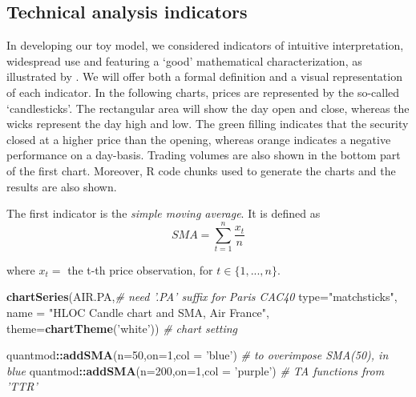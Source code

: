 \documentclass[
  11pt,
]{article}
\newenvironment{Shaded}{\begin{snugshade}}{\end{snugshade}}
\newcommand{\CommentTok}[1]{\textcolor[rgb]{0.56,0.35,0.01}{\textit{#1}}}
\newcommand{\DataTypeTok}[1]{\textcolor[rgb]{0.13,0.29,0.53}{#1}}
\newcommand{\DecValTok}[1]{\textcolor[rgb]{0.00,0.00,0.81}{#1}}
\newcommand{\KeywordTok}[1]{\textcolor[rgb]{0.13,0.29,0.53}{\textbf{#1}}}
\newcommand{\NormalTok}[1]{#1}
\newcommand{\OperatorTok}[1]{\textcolor[rgb]{0.81,0.36,0.00}{\textbf{#1}}}
\newcommand{\StringTok}[1]{\textcolor[rgb]{0.31,0.60,0.02}{#1}}
\begin{document}
\hypertarget{technical-analysis-indicators}{%
\subsection{Technical analysis
indicators}\label{technical-analysis-indicators}}

In developing our toy model, we considered indicators of intuitive
interpretation, widespread use and featuring a `good' mathematical
characterization, as illustrated by \citet{Neftci1991}. We will offer
both a formal definition and a visual representation of each indicator.
In the following charts, prices are represented by the so-called
`candlesticks'. The rectangular area will show the day open and close,
whereas the wicks represent the day high and low. The green filling
indicates that the security closed at a higher price than the opening,
whereas orange indicates a negative performance on a day-basis. Trading
volumes are also shown in the bottom part of the first chart. Moreover,
R code chunks used to generate the charts and the results are also
shown.

The first indicator is the \emph{simple moving average}. It is defined
as \begin{equation} 
SMA = \displaystyle \sum_{t=1}^{n} \frac{x_t}{n} 
\end{equation}

where \(x_t =\) the t-th price observation, for \(t \in \{1,...,n\}\).

\begin{Shaded}
\begin{Highlighting}[]
\KeywordTok{chartSeries}\NormalTok{(AIR.PA,}\CommentTok{# need '.PA' suffix for Paris CAC40}
            \DataTypeTok{type=}\StringTok{"matchsticks"}\NormalTok{,}
            \DataTypeTok{name =} \StringTok{"HLOC Candle chart and SMA, Air France"}\NormalTok{,}
            \DataTypeTok{theme=}\KeywordTok{chartTheme}\NormalTok{(}\StringTok{'white'}\NormalTok{)) }\CommentTok{# chart setting}

\NormalTok{quantmod}\OperatorTok{::}\KeywordTok{addSMA}\NormalTok{(}\DataTypeTok{n=}\DecValTok{50}\NormalTok{,}\DataTypeTok{on=}\DecValTok{1}\NormalTok{,}\DataTypeTok{col =} \StringTok{'blue'}\NormalTok{) }\CommentTok{# to overimpose SMA(50), in blue}
\NormalTok{quantmod}\OperatorTok{::}\KeywordTok{addSMA}\NormalTok{(}\DataTypeTok{n=}\DecValTok{200}\NormalTok{,}\DataTypeTok{on=}\DecValTok{1}\NormalTok{,}\DataTypeTok{col =} \StringTok{'purple'}\NormalTok{) }\CommentTok{# TA functions from 'TTR' }
\end{Highlighting}
\end{Shaded}
\end{document}

